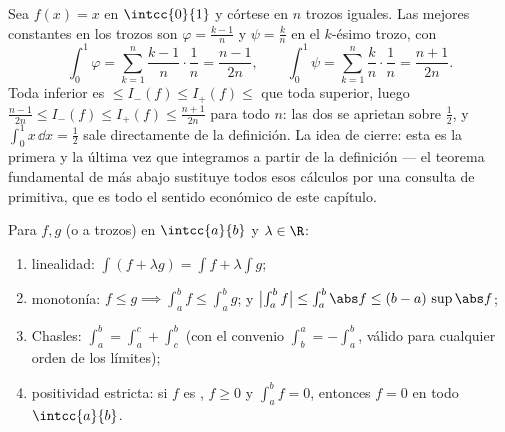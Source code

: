 \begin{example}\label{ex:b1:integration:defcompute}
Sea $f(x) = x$ en $\intcc{0}{1}$ y córtese en $n$ trozos iguales. Las
mejores  constantes en los trozos son
$\varphi = \frac{k-1}{n}$ y $\psi = \frac kn$ en el $k$-ésimo trozo,
con
\[
\int_0^1 \varphi = \sum_{k=1}^{n} \frac{k-1}{n}\cdot\frac1n
= \frac{n-1}{2n},
\qquad
\int_0^1 \psi = \sum_{k=1}^{n} \frac{k}{n}\cdot\frac1n
= \frac{n+1}{2n} .
\]
Toda  inferior es $\leq I_-(f) \leq I_+(f) \leq$ que toda
superior, luego $\frac{n-1}{2n} \leq I_-(f) \leq I_+(f) \leq
\frac{n+1}{2n}$ para todo $n$: las dos se aprietan sobre $\frac12$, y
$\int_0^1 x\,\dd x = \frac12$ sale directamente de la definición. La
idea de cierre: esta es la primera y la última vez que integramos a
partir de la definición --- el teorema fundamental de más abajo
sustituye todos esos cálculos por una consulta de primitiva, que es
todo el sentido económico de este capítulo.
\end{example}

\begin{theorem}[Propiedades]\label{thm:b1:integration:props}
Para $f, g$  (o  a trozos) en $\intcc{a}{b}$ y
$\lambda \in \R$:
\begin{enumerate}
  \item linealidad: $\int (f + \lambda g) = \int f + \lambda \int g$;
  \item monotonía: $f \leq g \implies \int_a^b f \leq \int_a^b g$;
        y $\bigl|\int_a^b f\bigr| \leq \int_a^b \abs f \leq (b -
        a)\, \sup\abs f$;
  \item Chasles: $\int_a^b = \int_a^c + \int_c^b$ (con el convenio
        $\int_b^a = -\int_a^b$, válido para cualquier orden de los
        límites);
  \item positividad estricta: si $f$ es , $f \geq 0$ y
        $\int_a^b f = 0$, entonces $f = 0$ en todo $\intcc{a}{b}$.
\end{enumerate}
\end{theorem}

